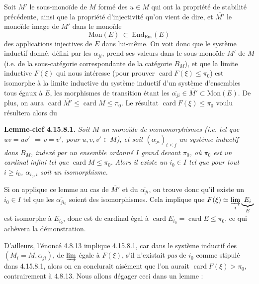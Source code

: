 \documentclass[11pt]{article}
\newcommand{\printedpage}[1]{\marginpar{\footnotesize p.~#1}}
\newcommand{\msp}[1]{\marginpar{\footnotesize [#1]}}
\newcommand{\card}{\operatorname{card}}
\begin{document}
Soit $M'$ le sous-monoïde de $M$ formé des $u \in M$ qui ont la propriété de stabilité précédente, ainsi que la propriété d'injectivité qu'on vient de dire, et $\overline{M'}$ le monoïde image de $M'$ dans le monoïde
\[
\mathrm{Mon}(E) \ \subset \ \mathrm{End}_{\mathrm{Ens}}(E)
\]
\msp{page 456}
des applications injectives de $E$ dans lui-même. On voit donc que le système inductif donné, défini par les $\alpha_{ji}$, prend ses valeurs dans le sous-monoïde $M'$ de $M$ (i.e. de la sous-catégorie correspondante de la catégorie $B_M$), et que la limite inductive $F(\xi)$ qui nous intéresse (pour prouver $\card F(\xi) \leqslant \pi_0$) est isomorphe à la limite inductive du système inductif d'un système d'ensembles tous égaux à $E$, les morphismes de transition étant les $\overline{\alpha_{ji}} \in \overline{M'} \subset \mathrm{Mon}(E)$. De plus, on aura $\card \overline{M'} \leqslant \card M \leqslant \pi_0$. Le résultat $\card F(\xi) \leqslant \pi_0$ voulu résultera alors du

\textbf{Lemme-clef 4.15.8.1.} \textit{Soit $M$ un monoïde de monomorphismes (i.e. tel que $uv = uv'$ $\Longrightarrow v = v'$, pour $u,v,v' \in M$), et soit $(\alpha_{ji})_{i\leqslant j}$ un système inductif dans $B_M$, indexé par un ensemble ordonné $I$ grand devant $\pi_0$, où $\pi_0$ est un cardinal}
\printedpage{177}
\msp{page 457}
\textit{infini tel que} $\card M \leqslant \pi_0$. \textit{Alors il existe un $i_0 \in I$ tel que pour tout $i \geqslant i_0$, $\alpha_{i_0,i}$ soit un isomorphisme.}

Si on applique ce lemme au cas de $\overline{M'}$ et du $\overline{\alpha_{ji}}$, on trouve donc qu'il existe un $i_0 \in I$ tel que les $\overline{\alpha_{ji_0}}$ soient des isomorphismes. Cela implique que $F(\xi) \simeq \varinjlim\limits_{i} \underbrace{E_i}_{E}$ est isomorphe à $E_{i_0}$, donc est de cardinal égal à $\card E_{i_0} = \card E \leqslant \pi_0$, ce qui achèvera la démonstration.

D'ailleurs, l'énoncé 4.8.13 implique 4.15.8.1, car dans le système inductif des $(M_i = M, \alpha_{ji})$, de $\varinjlim$ égale à $F(\xi)$, s'il n'existait \textit{pas} de $i_0$ comme stipulé dans 4.15.8.1, alors on en conclurait aisément que l'on aurait $\card F(\xi) > \pi_0$, contrairement à 4.8.13. Nous allons dégager ceci dans un lemme :
\end{document}
